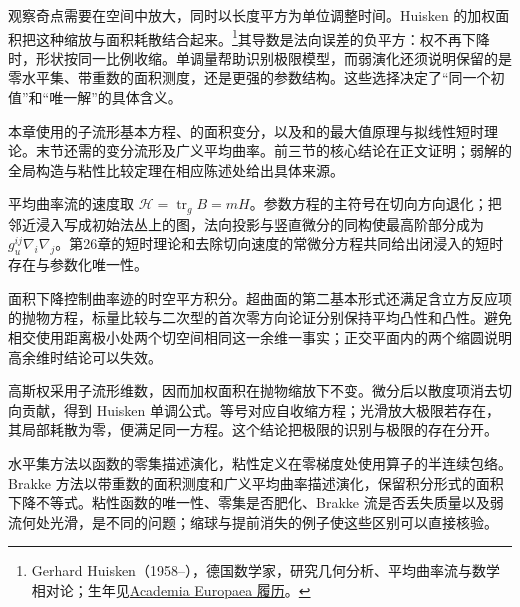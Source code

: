 \ProseParagraphBreak
观察奇点需要在空间中放大，同时以长度平方为单位调整时间。Huisken 的加权面积把这种缩放与面积耗散结合起来。\footnote{Gerhard Huisken（1958--），德国数学家，研究几何分析、平均曲率流与数学相对论；生年见\href{https://www.ae-info.org/ae/Member/Huisken_Gerhard/CV}{Academia Europaea 履历}。}其导数是法向误差的负平方：权不再下降时，形状按同一比例收缩。单调量帮助识别极限模型，而弱演化还须说明保留的是零水平集、带重数的面积测度，还是更强的参数结构。这些选择决定了“同一个初值”和“唯一解”的具体含义。

\ProseParagraphBreak
本章使用的子流形基本方程、的面积变分，以及和的最大值原理与拟线性短时理论。末节还需的变分流形及广义平均曲率。前三节的核心结论在正文证明；弱解的全局构造与粘性比较定理在相应陈述处给出具体来源。






\begin{chaptersummary}
	平均曲率流的速度取 \(\mathcal H=\operatorname{tr}_gB=mH\)。参数方程的主符号在切向方向退化；把邻近浸入写成初始法丛上的图，法向投影与竖直微分的同构使最高阶部分成为 \(g_u^{ij}\nabla_i\nabla_j\)。第26章的短时理论和去除切向速度的常微分方程共同给出闭浸入的短时存在与参数化唯一性。

	\ProseParagraphBreak
	面积下降控制曲率迹的时空平方积分。超曲面的第二基本形式还满足含立方反应项的抛物方程，标量比较与二次型的首次零方向论证分别保持平均凸性和凸性。避免相交使用距离极小处两个切空间相同这一余维一事实；正交平面内的两个缩圆说明高余维时结论可以失效。

	\ProseParagraphBreak
	高斯权采用子流形维数，因而加权面积在抛物缩放下不变。微分后以散度项消去切向贡献，得到 Huisken 单调公式。等号对应自收缩方程；光滑放大极限若存在，其局部耗散为零，便满足同一方程。这个结论把极限的识别与极限的存在分开。

	\ProseParagraphBreak
	水平集方法以函数的零集描述演化，粘性定义在零梯度处使用算子的半连续包络。Brakke 方法以带重数的面积测度和广义平均曲率描述演化，保留积分形式的面积下降不等式。粘性函数的唯一性、零集是否肥化、Brakke 流是否丢失质量以及弱流何处光滑，是不同的问题；缩球与提前消失的例子使这些区别可以直接核验。
\end{chaptersummary}

\BookExercises

